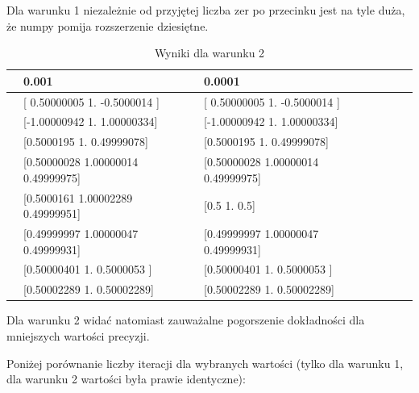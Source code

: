 \documentclass{article}
\begin{document}
Dla warunku 1 niezależnie od przyjętej liczba zer po przecinku jest na tyle duża, że numpy pomija rozszerzenie dziesiętne.

\begin{table}[H]
\centering
\begin{tabular}{|l|l|l|l|l|l|}
\hline
& 0.001 & 0.0001  \\ \hline
[0.3, 0.3, 0.3] & [ 0.50000005  1.         -0.5000014 ] & [ 0.50000005  1.         -0.5000014 ] \\ \hline
[0.4, 0.4, 0.4] & [-1.00000942  1.          1.00000334] & [-1.00000942  1.          1.00000334]  \\ \hline
[0.5, 0.5, 0.5] & [0.5000195  1.         0.49999078] & [0.5000195  1.         0.49999078]  \\ \hline
[0.6, 0.6, 0.6] & [0.50000028 1.00000014 0.49999975] & [0.50000028 1.00000014 0.49999975]  \\ \hline
[0.7, 0.7, 0.7] & [0.5000161  1.00002289 0.49999951] & [0.5 1.  0.5] \\ \hline
[0.8, 0.8, 0.8] & [0.49999997 1.00000047 0.49999931] & [0.49999997 1.00000047 0.49999931]  \\ \hline
[0.9, 0.9, 0.9] & [0.50000401 1.         0.5000053 ] & [0.50000401 1.         0.5000053 ]  \\ \hline
[1.0, 1.0, 1.0] & [0.50002289 1.         0.50002289] & [0.50002289 1.         0.50002289]  \\ \hline
\end{tabular}
\caption{Wyniki dla warunku 2}
\end{table}

Dla warunku 2 widać natomiast zauważalne pogorszenie dokładności dla mniejszych wartości precyzji.

Poniżej porównanie liczby iteracji dla wybranych wartości (tylko dla warunku 1, dla warunku 2 wartości była prawie identyczne):
\end{document}
